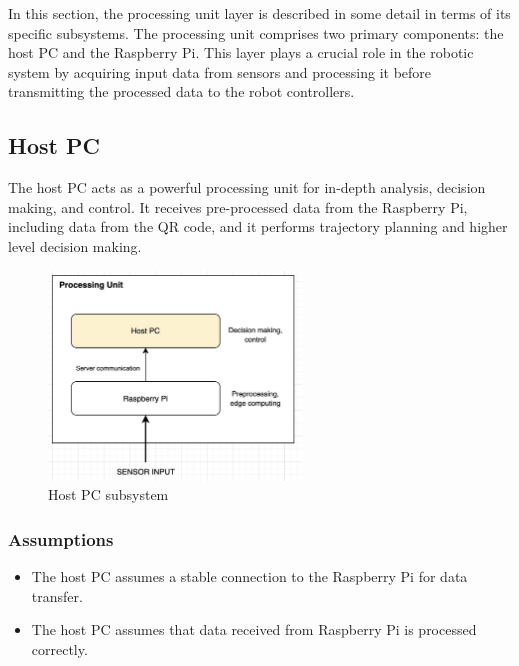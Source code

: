 In this section, the processing unit layer is described in some detail in terms of its specific subsystems. The processing unit comprises two primary components: the host PC and the Raspberry Pi. This layer plays a crucial role in the robotic system by acquiring input data from sensors and processing it before transmitting the processed data to the robot controllers.

\subsection{Host PC}
The host PC acts as a powerful processing unit for in-depth analysis, decision making, and control. It receives pre-processed data from the Raspberry Pi, including data from the QR code, and it performs trajectory planning and higher level decision making.

\begin{figure}[h!]
	\centering
 	\includegraphics[width=0.60\textwidth]{images/host_pc.png}
 \caption{Host PC subsystem}
\end{figure}

\subsubsection{Assumptions}
\begin{itemize}
    \item The host PC assumes a stable connection to the Raspberry Pi for data transfer.
    \item The host PC assumes that data received from Raspberry Pi is processed correctly.
\end{itemize}

